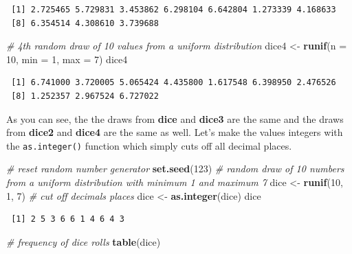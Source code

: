 \documentclass[]{article}
\newenvironment{Shaded}{\begin{snugshade}}{\end{snugshade}}
\newcommand{\KeywordTok}[1]{\textcolor[rgb]{0.13,0.29,0.53}{\textbf{#1}}}
\newcommand{\DataTypeTok}[1]{\textcolor[rgb]{0.13,0.29,0.53}{#1}}
\newcommand{\DecValTok}[1]{\textcolor[rgb]{0.00,0.00,0.81}{#1}}
\newcommand{\StringTok}[1]{\textcolor[rgb]{0.31,0.60,0.02}{#1}}
\newcommand{\CommentTok}[1]{\textcolor[rgb]{0.56,0.35,0.01}{\textit{#1}}}
\newcommand{\NormalTok}[1]{#1}
\theoremstyle{definition}
\theoremstyle{definition}
\theoremstyle{definition}
\theoremstyle{remark}
\begin{document}
\begin{verbatim}
 [1] 2.725465 5.729831 3.453862 6.298104 6.642804 1.273339 4.168633
 [8] 6.354514 4.308610 3.739688
\end{verbatim}

\begin{Shaded}
\begin{Highlighting}[]
\CommentTok{# 4th random draw of 10 values from a uniform distribution}
\NormalTok{dice4 <-}\StringTok{ }\KeywordTok{runif}\NormalTok{(}\DataTypeTok{n =} \DecValTok{10}\NormalTok{, }\DataTypeTok{min =} \DecValTok{1}\NormalTok{, }\DataTypeTok{max =} \DecValTok{7}\NormalTok{)}
\NormalTok{dice4}
\end{Highlighting}
\end{Shaded}

\begin{verbatim}
 [1] 6.741000 3.720005 5.065424 4.435800 1.617548 6.398950 2.476526
 [8] 1.252357 2.967524 6.727022
\end{verbatim}

As you can see, the the draws from \textbf{dice} and \textbf{dice3} are
the same and the draws from \textbf{dice2} and \textbf{dice4} are the
same as well. Let's make the values integers with the
\texttt{as.integer()} function which simply cuts off all decimal places.

\begin{Shaded}
\begin{Highlighting}[]
\CommentTok{# reset random number generator}
\KeywordTok{set.seed}\NormalTok{(}\DecValTok{123}\NormalTok{)}
\CommentTok{# random draw of 10 numbers from a uniform distribution with minimum 1 and maximum 7}
\NormalTok{dice <-}\StringTok{ }\KeywordTok{runif}\NormalTok{(}\DecValTok{10}\NormalTok{, }\DecValTok{1}\NormalTok{, }\DecValTok{7}\NormalTok{)}
\CommentTok{# cut off decimals places}
\NormalTok{dice <-}\StringTok{ }\KeywordTok{as.integer}\NormalTok{(dice)}
\NormalTok{dice}
\end{Highlighting}
\end{Shaded}

\begin{verbatim}
 [1] 2 5 3 6 6 1 4 6 4 3
\end{verbatim}

\begin{Shaded}
\begin{Highlighting}[]
\CommentTok{# frequency of dice rolls}
\KeywordTok{table}\NormalTok{(dice)}
\end{Highlighting}
\end{Shaded}
\end{document}
